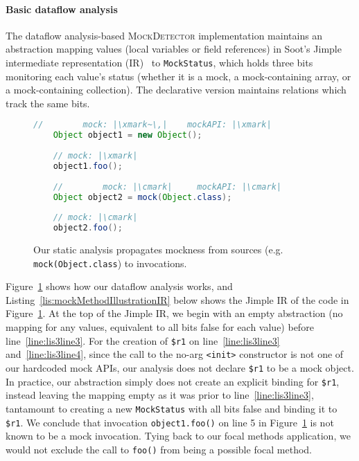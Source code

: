 \paragraph{Basic dataflow analysis} The dataflow analysis-based \textsc{MockDetector} implementation maintains an abstraction mapping values (local variables or field references) in Soot's Jimple intermediate representation (IR)~\cite{Vallee-Rai:1999:SJB:781995.782008} to \texttt{MockStatus}, which holds three bits monitoring each value's status (whether it is a mock, a mock-containing array, or a mock-containing collection). The declarative version maintains relations which track the same bits.

\begin{figure}
\begin{lstlisting}[basicstyle=\ttfamily,
basicstyle=\scriptsize\ttfamily,language = Java, framesep=4.5mm, framexleftmargin=1.0mm, captionpos=b, escapechar=|, morekeywords={@Test}]
	//        mock: |\xmark~\,|    mockAPI: |\xmark|
	Object object1 = new Object();
	
	// mock: |\xmark|
	object1.foo();
	
	//        mock: |\cmark|     mockAPI: |\cmark|
	Object object2 = mock(Object.class);
	
	// mock: |\cmark|
	object2.foo();
\end{lstlisting}
    
    \caption{Our static analysis propagates mockness from sources (e.g. \texttt{mock(Object.class}) to invocations.}
    \label{fig:mockMethodIllustration}
    
\end{figure}

Figure~\ref{fig:mockMethodIllustration} shows how our dataflow analysis works, and Listing~\ref{lis:mockMethodIllustrationIR} below shows the Jimple IR of the code in Figure~\ref{fig:mockMethodIllustration}. At the top of the Jimple IR, we begin with an empty abstraction (no mapping for any values, equivalent to all bits false for each value) before line~\ref{line:lis3line3}. For the creation of \texttt{\$r1} on line~\ref{line:lis3line3} and~\ref{line:lis3line4}, since the call to the no-arg \texttt{<init>} constructor is not one of our hardcoded mock APIs, our analysis does not declare \texttt{\$r1} to be a mock object. In practice, our abstraction simply does not create an explicit binding for \texttt{\$r1}, instead leaving the mapping empty as it was prior to line~\ref{line:lis3line3}, tantamount to creating a new \texttt{MockStatus} with all bits false and binding it to \texttt{\$r1}. We conclude that invocation \texttt{object1.foo()} on line 5 in Figure~\ref{fig:mockMethodIllustration} is not known to be a mock invocation. Tying back to our focal methods application, we would not exclude the call to \texttt{foo()} from being a possible focal method.

